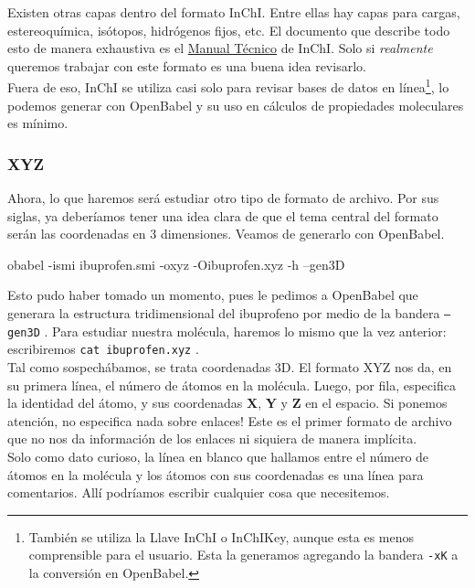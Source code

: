\documentclass[10pt,letterpaper]{article}
\newcommand{\inlinecode}[1]{
\colorbox{light-gray}{\texttt{#1}}
}
\newenvironment{Code}
{
\begin{lrbox}{\selvestebox}%
\begin{minipage}{\dimexpr\columnwidth-2\fboxsep\relax}
\fontfamily{\ttdefault}\selectfont
}
{\end{minipage}\end{lrbox}%
\begin{center}
\colorbox{light-gray}{\usebox{\selvestebox}}
\end{center}
}
\begin{document}
Existen otras capas dentro del formato InChI. Entre ellas hay capas para cargas, estereoqu\'imica, is\'otopos, hidr\'ogenos fijos, etc. El documento que describe todo esto de manera exhaustiva es el \href{http://www.inchi-trust.org/download/104/InChI_TechMan.pdf}{Manual T\'ecnico} de InChI. Solo si \emph{realmente} queremos trabajar con este formato es una buena idea revisarlo.\\

Fuera de eso, InChI se utiliza casi solo para revisar bases de datos en l\'inea\footnote{Tambi\'en se utiliza la Llave InChI o InChIKey, aunque esta es menos comprensible para el usuario. Esta la generamos agregando la bandera \inlinecode{-xK} a la conversi\'on en OpenBabel.}, lo podemos generar con OpenBabel y su uso en c\'alculos de propiedades moleculares es m\'inimo.

\subsubsection{XYZ}
Ahora, lo que haremos ser\'a estudiar otro tipo de formato de archivo. Por sus siglas, ya deber\'iamos tener una idea clara de que el tema central del formato ser\'an las coordenadas en 3 dimensiones. Veamos de generarlo con OpenBabel.

\begin{Code}
obabel -ismi ibuprofen.smi -oxyz -Oibuprofen.xyz -h --gen3D
\end{Code}

Esto pudo haber tomado un momento, pues le pedimos a OpenBabel que generara la estructura tridimensional del ibuprofeno por medio de la bandera \inlinecode{--gen3D}. Para estudiar nuestra mol\'ecula, haremos lo mismo que la vez anterior: escribiremos \inlinecode{cat ibuprofen.xyz}.\\

Tal como sospech\'abamos, se trata coordenadas 3D. El formato XYZ nos da, en su primera l\'inea, el n\'umero de \'atomos en la mol\'ecula. Luego, por fila, especifica la identidad del \'atomo, y sus coordenadas \textbf{X}, \textbf{Y} y \textbf{Z} en el espacio. Si ponemos atenci\'on, no especifica nada sobre enlaces! Este es el primer formato de archivo que no nos da informaci\'on de los enlaces ni siquiera de manera impl\'icita.\\

Solo como dato curioso, la l\'inea en blanco que hallamos entre el n\'umero de \'atomos en la mol\'ecula y los \'atomos con sus coordenadas es una l\'inea para comentarios. All\'i podr\'iamos escribir cualquier cosa que necesitemos.\\
\end{document}
